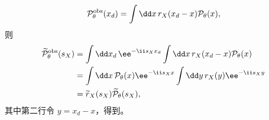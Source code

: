 \begin{exbox}[能量格与纵向相空间层析]
\[
\mathcal P_\theta^{\rm obs}(x_d)
=\int\dd x\,r_X(x_d-x)\mathcal P_\theta(x),
\]
则
\begin{align*}
\widetilde{\mathcal P}_\theta^{\rm obs}(s_X)
&=\int\dd x_d\,\ee^{-\ii s_Xx_d}
\int\dd x\,r_X(x_d-x)\mathcal P_\theta(x)\\
&=\int\dd x\,\mathcal P_\theta(x)\ee^{-\ii s_Xx}
\int\dd y\,r_X(y)\ee^{-\ii s_Xy}\\
&=\widetilde r_X(s_X)\widetilde{\mathcal P}_\theta(s_X),
\end{align*}
其中第二行令 $y=x_d-x$，得到。
\end{exbox}



